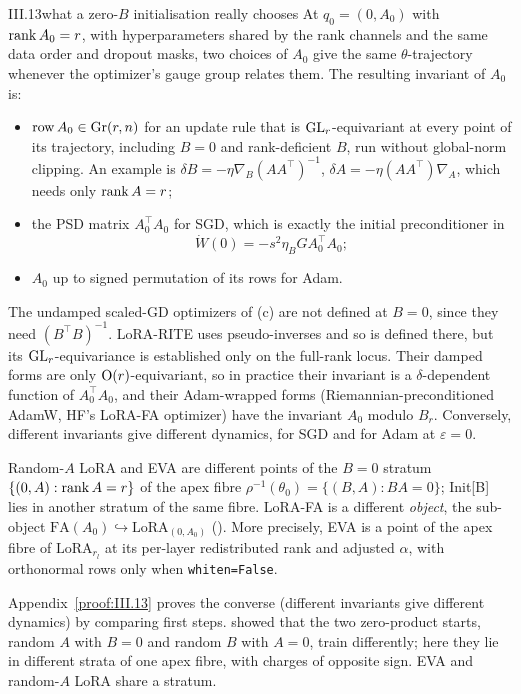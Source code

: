 \begin{corollary}{III.13}{what a zero-$B$ initialisation really chooses}
At $q_0=(0,A_0)$ with $\operatorname{rank} A_0=r$, with hyperparameters shared by the rank channels and the same data order and dropout
masks, two choices of $A_0$ give the same $\theta$-trajectory whenever the optimizer's gauge group relates them. The
resulting invariant of $A_0$ is:
\begin{itemize}
\item $\operatorname{row}A_0\in\operatorname{Gr}(r,n)$ for an update rule that is $\mathrm{GL}_r$-equivariant at every point of its
  trajectory, including $B=0$ and rank-deficient $B$, run without global-norm clipping. An example is
  $\delta B=-\eta\nabla_B(AA^\top)^{-1}$, $\delta A=-\eta(AA^\top)\nabla_A$, which needs only $\operatorname{rank} A=r$;
\item the PSD matrix $A_0^\top A_0$ for SGD, which is exactly the initial preconditioner in
  \[\dot W(0)=-s^2\eta_BGA_0^\top A_0;\]
\item $A_0$ up to signed permutation of its rows for Adam.
\end{itemize}
The undamped scaled-GD optimizers of (c) are not defined at $B=0$, since they need
$(B^\top B)^{-1}$. LoRA-RITE uses pseudo-inverses and so is defined there, but its $\mathrm{GL}_r$-equivariance is established
only on the full-rank locus. Their damped forms are only $\mathrm{O}(r)$-equivariant, so in practice their invariant is a
$\delta$-dependent function of $A_0^\top A_0$, and their Adam-wrapped forms (Riemannian-preconditioned AdamW, HF's
LoRA-FA optimizer) have the invariant $A_0$ modulo $B_r$. Conversely, different invariants give different dynamics, for
SGD and for Adam at $\varepsilon=0$.

Random-$A$ LoRA and EVA are different points of the $B=0$ stratum $\{(0,A):\operatorname{rank} A=r\}$ of the apex fibre
$\rho^{-1}(\theta_0)=\{(B,A):BA=0\}$; Init[B] lies in another stratum of the same fibre. LoRA-FA is a different
\emph{object}, the sub-object $\mathrm{FA}(A_0)\hookrightarrow\mathrm{LoRA}_{(0,A_0)}$ (). More
precisely, EVA is a point of the apex fibre of $\mathrm{LoRA}_{r_l}$ at its per-layer redistributed rank and adjusted
$\alpha$, with orthonormal rows only when \texttt{whiten=False}.
\end{corollary}

Appendix~\ref{proof:III.13} proves the converse (different invariants give different dynamics) by comparing first
steps. \citet{hayou2024impact} showed that the two zero-product starts, random $A$ with
$B=0$ and random $B$ with $A=0$, train differently; here they lie in different strata of one apex fibre, with charges of
opposite sign. EVA \citep{paischer2024parameter} and random-$A$ LoRA share a stratum.

